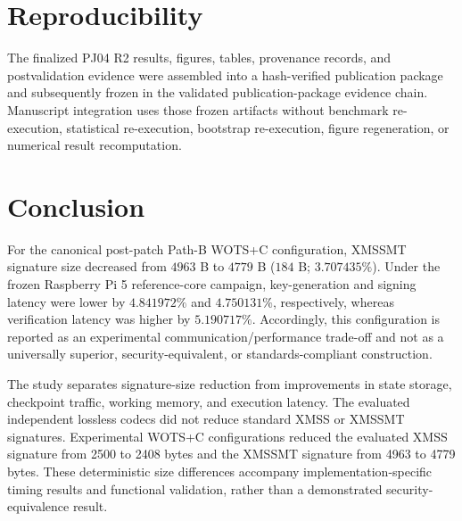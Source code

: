 \documentclass[pdflatex,sn-mathphys-num]{sn-jnl}
\begin{document}
\label{sec:limitations}


\section{Reproducibility}

The finalized PJ04 R2 results, figures, tables, provenance records, and
postvalidation evidence were assembled into a hash-verified publication
package and subsequently frozen in the validated publication-package evidence
chain. Manuscript integration uses those frozen artifacts without benchmark
re-execution, statistical re-execution, bootstrap re-execution, figure
regeneration, or numerical result recomputation.

\label{sec:reproducibility}


\section{Conclusion}


For the canonical post-patch Path-B WOTS+C configuration,
XMSSMT signature size decreased from $4963$ B to $4779$ B
($184$ B; $3.707435\%$). Under the frozen Raspberry Pi 5
reference-core campaign, key-generation and signing latency
were lower by $4.841972\%$ and $4.750131\%$, respectively,
whereas verification latency was higher by $5.190717\%$.
Accordingly, this configuration is reported as an experimental
communication/performance trade-off and not as a universally
superior, security-equivalent, or standards-compliant
construction.



The study separates signature-size reduction from improvements in
state storage, checkpoint traffic, working memory, and execution
latency. The evaluated independent lossless codecs did not reduce
standard XMSS or XMSSMT signatures. Experimental WOTS+C configurations
reduced the evaluated XMSS signature from 2500 to 2408 bytes and the
XMSSMT signature from 4963 to 4779 bytes. These deterministic size
differences accompany implementation-specific timing results and
functional validation, rather than a demonstrated security-equivalence
result.
\end{document}
